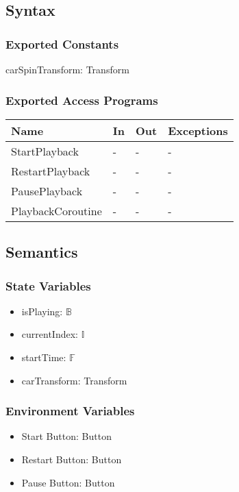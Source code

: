 \documentclass[12pt, titlepage]{article}
\begin{document}
\subsection{Syntax}

\subsubsection{Exported Constants}
carSpinTransform: Transform

\subsubsection{Exported Access Programs}

\begin{center}
\begin{tabular}{p{4cm} p{4cm} p{4cm} p{2cm}}
\hline
\textbf{Name} & \textbf{In} & \textbf{Out} & \textbf{Exceptions} \\
\hline
StartPlayback & - & - & - \\
RestartPlayback & - & - & - \\
PausePlayback & - & - & - \\
PlaybackCoroutine & - & - & - \\
\hline
\end{tabular}
\end{center}

\subsection{Semantics}

\subsubsection{State Variables}

\begin{itemize}
  \item isPlaying: $\mathbb{B}$
  \item currentIndex: $\mathbb{I}$
  \item startTime: $\mathbb{F}$ 
  \item carTransform: Transform
\end{itemize}

\subsubsection{Environment Variables}

\begin{itemize}
  \item Start Button: Button
  \item Restart Button: Button
  \item Pause Button: Button
\end{itemize}
\end{document}
